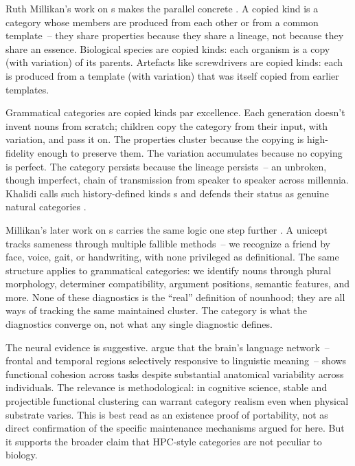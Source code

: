Ruth Millikan's work on s makes the parallel concrete \citep{millikan1984,millikan2017}. A copied kind is a category whose members are produced from each other or from a common template~-- they share properties because they share a lineage, not because they share an essence. Biological species are copied kinds: each organism is a copy (with variation) of its parents. Artefacts like screwdrivers are copied kinds: each is produced from a template (with variation) that was itself copied from earlier templates.

Grammatical categories are copied kinds par excellence. Each generation doesn't invent nouns from scratch; children copy the category from their input, with variation, and pass it on. The properties cluster because the copying is high-fidelity enough to preserve them. The variation accumulates because no copying is perfect. The category persists because the lineage persists~-- an unbroken, though imperfect, chain of transmission from speaker to speaker across millennia. Khalidi calls such history-defined kinds s and defends their status as genuine natural categories \citep[106--112]{khalidi2013}.

Millikan's later work on s carries the same logic one step further \citep[ch.~3]{millikan2017}. A unicept tracks sameness through multiple fallible methods~-- we recognize a friend by face, voice, gait, or handwriting, with none privileged as definitional. The same structure applies to grammatical categories: we identify nouns through plural morphology, determiner compatibility, argument positions, semantic features, and more. None of these diagnostics is the \enquote{real} definition of nounhood; they are all ways of tracking the same maintained cluster. The category is what the diagnostics converge on, not what any single diagnostic defines.

The neural evidence is suggestive. \textcite{Fedorenko2024naturalkind} argue that the brain's language network~-- frontal and temporal regions selectively responsive to linguistic meaning~-- shows functional cohesion across tasks despite substantial anatomical variability across individuals. The relevance is methodological: in cognitive science, stable and projectible functional clustering can warrant category realism even when physical substrate varies. This is best read as an existence proof of portability, not as direct confirmation of the specific maintenance mechanisms argued for here. But it supports the broader claim that HPC-style categories are not peculiar to biology.

